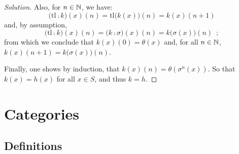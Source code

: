 \begin{proof}[Solution]
    Also, for $n\in\mathbb{N}$, we have:
    \[
      \big(\mathrm{tl} \comp k\big) (x) (n)
      = \mathrm{tl} \big(k(x)\big) (n)
      = k(x)(n + 1)
    \]
    and, by assumption,
    \[
      \big(\mathrm{tl} \comp k\big) (x) (n)
      = \big(k \comp \sigma\big) (x) (n)
      = k \big(\sigma (x)\big)(n)
      \enspace;
    \]
    from which we conclude that $k(x)(0) = \theta(x)$ and, for all $n\in\mathbb{N}$,
    $k(x)(n+1) = k\big(\sigma(x)\big)(n)$.

    Finally, one shows by induction, that
    $k(x)(n) = \theta(\sigma^n (x))$.  So that $k(x)=h(x)$ for all $x\in S$,
    and thus $k=h$.
  \end{proof}

\chapter{Categories}

\section{Definitions}

